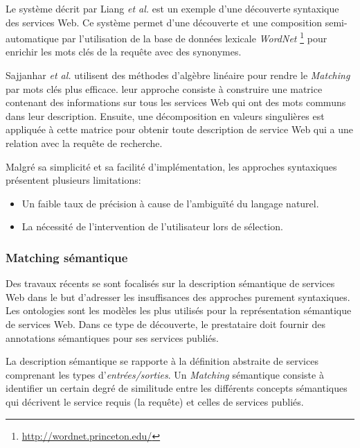     Le système décrit par Liang \textit{et al.}
    \cite{DBLP:journals/jwsr/LiangCSCL04} est un exemple d'une
    découverte syntaxique des services Web. Ce système permet d'une
    découverte et une composition semi-automatique par l'utilisation
    de la base de données lexicale \textit{WordNet}
    \footnote{\url{http://wordnet.princeton.edu/}}
    \cite{miller1990introduction} pour enrichir les mots clés de la
    requête avec des synonymes.\medskip

    Sajjanhar \textit{et al.} \cite{sajjanhar2004algorithm} utilisent
    des méthodes d'algèbre linéaire pour rendre le \textit{Matching}
    par mots clés plus efficace. leur approche consiste à construire
    une matrice contenant des informations sur tous les services Web
    qui ont des mots communs dans leur description. Ensuite, une
    décomposition en valeurs singulières est appliquée à cette matrice
    pour obtenir toute description de service Web qui a une relation
    avec la requête de recherche.\medskip

    Malgré sa simplicité et sa facilité d'implémentation, les
    approches syntaxiques présentent plusieurs limitations:

    \begin{itemize}\renewcommand\labelitemi{--}
    \item Un faible taux de précision à cause de l'ambiguïté du
      langage naturel.
    \item La nécessité de l'intervention de l'utilisateur lors de
      sélection.
    \end{itemize}

    \subsubsection{Matching sémantique}
    \label{sec:matching-semanique}
    Des travaux récents \cite{paolucci2002semantic,
      benatallah2005automating, keller2004wsmo, benatallah2003request,
      jaeger2005ranked} se sont focalisés sur la description
    sémantique de services Web dans le but d'adresser les
    insuffisances des approches purement syntaxiques. Les ontologies
    sont les modèles les plus utilisés pour la représentation
    sémantique de services Web. Dans ce type de découverte, le
    prestataire doit fournir des annotations sémantiques pour ses
    services publiés.\medskip

    La description sémantique se rapporte à la définition abstraite de
    services comprenant les types d'\textit{entrées/sorties}. Un
    \textit{Matching} sémantique consiste à identifier un certain
    degré de similitude entre les différents concepts sémantiques qui
    décrivent le service requis (la requête) et celles de services
    publiés.\bigskip

